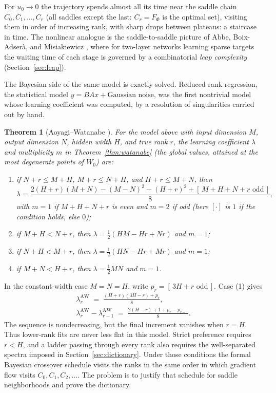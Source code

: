 \documentclass[11pt]{amsart}
\theoremstyle{plain}
\newtheorem{theorem}{Theorem}[section]
\theoremstyle{definition}
\begin{document}
For $u_0 \to 0$ the trajectory spends almost all its time near the saddle chain $C_0, C_1, \dots, C_r$ (all saddles except the last: $C_r = F_\Phi$ is the optimal set), visiting them in order of increasing rank, with sharp drops between plateaus: a staircase in time. The nonlinear analogue is the saddle-to-saddle picture of Abbe, Boix-Adser\`a, and Misiakiewicz \cite{abbe2023}, where for two-layer networks learning sparse targets the waiting time of each stage is governed by a combinatorial \emph{leap complexity} (Section~\ref{sec:leap}).

The Bayesian side of the same model is exactly solved. Reduced rank regression, the statistical model $y = BAx + \text{Gaussian noise}$, was the first nontrivial model whose learning coefficient was computed, by a resolution of singularities carried out by hand.

\begin{theorem}[Aoyagi--Watanabe \cite{aoyagi2005}]\label{thm:aw}
For the model above with input dimension $M$, output dimension $N$, hidden width $H$, and true rank $r$, the learning coefficient $\lambda$ and multiplicity $m$ in Theorem~\ref{thm:watanabe} (the global values, attained at the most degenerate points of $W_0$) are:
\begin{enumerate}
\item if $N + r \le M + H$, $M + r \le N + H$, and $H + r \le M + N$, then
\[
   \lambda = \frac{2(H+r)(M+N) - (M-N)^2 - (H+r)^2 + [\,M{+}H{+}N{+}r \text{ odd}\,]}{8},
\]
with $m = 1$ if $M + H + N + r$ is even and $m = 2$ if odd (here $[\cdot]$ is $1$ if the condition holds, else $0$);
\item if $M + H < N + r$, then $\lambda = \tfrac12 (HM - Hr + Nr)$ and $m = 1$;
\item if $N + H < M + r$, then $\lambda = \tfrac12 (HN - Hr + Mr)$ and $m = 1$;
\item if $M + N < H + r$, then $\lambda = \tfrac12 MN$ and $m = 1$.
\end{enumerate}
\end{theorem}

In the constant-width case $M = N = H$, write $p_r = [\,3H+r\text{ odd}\,]$. Case (1) gives
\[
\begin{aligned}
   \lambda_r^{\mathrm{AW}} \;=\; \frac{(H+r)(3H-r)+p_r}{8},
   \\
   \lambda_r^{\mathrm{AW}}-\lambda_{r-1}^{\mathrm{AW}}
   \;=\; \frac{2(H-r)+1+p_r-p_{r-1}}{8}.
\end{aligned}
\]
The sequence is nondecreasing, but the final increment vanishes when $r=H$. Thus lower-rank fits are never less flat in this model. Strict preference requires $r<H$, and a ladder passing through every rank also requires the well-separated spectra imposed in Section~\ref{sec:dictionary}. Under those conditions the formal Bayesian crossover schedule visits the ranks in the same order in which gradient flow visits $C_0,C_1,C_2,\dots$. The problem is to justify that schedule for saddle neighborhoods and prove the dictionary.
\end{document}
